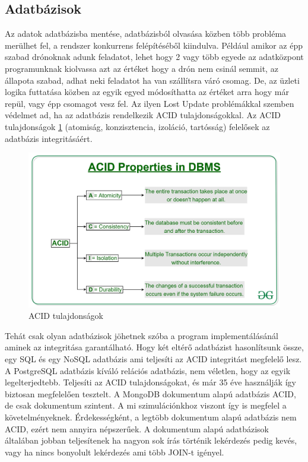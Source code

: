 \subsection{Adatbázisok}
Az adatok adatbázisba mentése, adatbázisból olvasása közben több probléma merülhet fel, a rendszer konkurrens felépítéséből kiindulva.
Például amikor az épp szabad drónoknak adunk feladatot, lehet hogy 2 vagy több egyede az adatközpont programunknak kiolvassa azt az értéket hogy a drón nem csinál semmit, az állapota szabad, adhat neki feladatot ha van szállítsra váró csomag.
De, az üzleti logika futtatása közben az egyik egyed módosíthatta
az értéket arra hogy már repül, vagy épp csomagot vesz fel.
Az ilyen Lost Update problémákkal szemben védelmet ad, ha az adatbázis rendelkezik ACID tulajdonságokkal.
Az ACID tulajdonságok \ref{fig:acid} (atomiság, konzisztencia, izoláció, tartósság) felelősek az adatbázis integritásáért.

\begin{figure}[h]
    \centering
    \includegraphics[scale=0.15]{images/ACID-Properties.jpg}
    \caption{ACID tulajdonságok}
    \label{fig:acid}
\end{figure}

Tehát csak olyan adatbázisok jöhetnek szóba a program implementálásánál aminek az integritása garantálható.
Hogy két eltérő adatbázist hasonlítsunk össze, egy SQL és egy NoSQL adatbázis ami teljesíti az ACID integritást megfelelő lesz.
A PostgreSQL adatbázis kíváló relációs adatbázis, nem véletlen, hogy az egyik legelterjedtebb. Teljesíti az ACID tulajdonságokat, és már 35 éve használják így biztosan megfelelően tesztelt.
A MongoDB dokumentum alapú adatbázis ACID, de csak dokumentum szintent. A mi szimulációnkhoz viszont így is megfelel a követelményeknek.
Érdekességként, a legtöbb dokumentum alapú adatbázis nem ACID, ezért nem annyira népszerűek.
A dokumentum alapú adatbázisok általában jobban teljesítenek ha nagyon sok írás történik lekérdezés pedig kevés, vagy ha nincs bonyolult lekérdezés ami több JOIN-t igényel.


